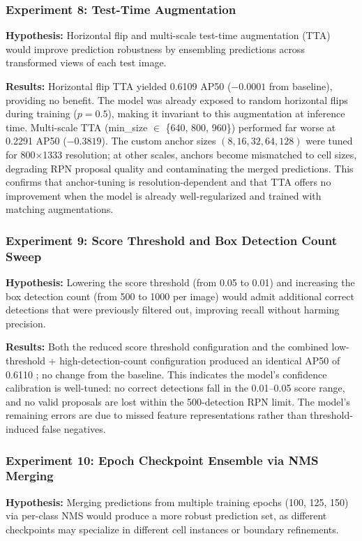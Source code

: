\documentclass[12pt, a4paper]{article}
\begin{document}
\subsubsection{Experiment 8: Test-Time Augmentation}
\textbf{Hypothesis:} Horizontal flip and multi-scale test-time augmentation (TTA) would improve prediction robustness by ensembling predictions across transformed views of each test image.

\textbf{Results:} Horizontal flip TTA yielded 0.6109 AP50 (${-}0.0001$ from baseline), providing no benefit. The model was already exposed to random horizontal flips during training ($p=0.5$), making it invariant to this augmentation at inference time. Multi-scale TTA (min\_size $\in$ \{640, 800, 960\}) performed far worse at 0.2291 AP50 (${-}0.3819$). The custom anchor sizes $(8, 16, 32, 64, 128)$ were tuned for 800$\times$1333 resolution; at other scales, anchors become mismatched to cell sizes, degrading RPN proposal quality and contaminating the merged predictions. This confirms that anchor-tuning is resolution-dependent and that TTA offers no improvement when the model is already well-regularized and trained with matching augmentations.

\subsubsection{Experiment 9: Score Threshold and Box Detection Count Sweep}
\textbf{Hypothesis:} Lowering the score threshold (from 0.05 to 0.01) and increasing the box detection count (from 500 to 1000 per image) would admit additional correct detections that were previously filtered out, improving recall without harming precision.

\textbf{Results:} Both the reduced score threshold configuration and the combined low-threshold + high-detection-count configuration produced an identical AP50 of 0.6110 ; no change from the baseline. This indicates the model's confidence calibration is well-tuned: no correct detections fall in the 0.01--0.05 score range, and no valid proposals are lost within the 500-detection RPN limit. The model's remaining errors are due to missed feature representations rather than threshold-induced false negatives.

\subsubsection{Experiment 10: Epoch Checkpoint Ensemble via NMS Merging}
\textbf{Hypothesis:} Merging predictions from multiple training epochs (100, 125, 150) via per-class NMS would produce a more robust prediction set, as different checkpoints may specialize in different cell instances or boundary refinements.
\end{document}
